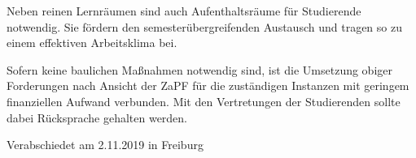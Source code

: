 \documentclass[a4paper]{scrartcl}
\begin{document}
Neben reinen Lernräumen sind auch Aufenthaltsräume für Studierende notwendig. Sie fördern den semesterübergreifenden Austausch und tragen so zu einem effektiven Arbeitsklima bei.

Sofern keine baulichen Maßnahmen notwendig sind, ist die Umsetzung obiger Forderungen nach Ansicht der ZaPF für die zuständigen Instanzen mit geringem finanziellen Aufwand verbunden. Mit den Vertretungen der Studierenden sollte dabei Rücksprache gehalten werden.

\vspace*{\fill}
\begin{flushright}
	Verabschiedet am 2.11.2019 in Freiburg
\end{flushright}
\end{document}
